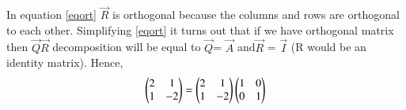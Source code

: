 \documentclass[journal,12pt,twocolumn]{IEEEtran}
\begin{document}
In equation \eqref{eqort} $\vec R$ is orthogonal because the columns and rows are orthogonal to each other.
Simplifying \eqref{eqort} it turns out that if we have orthogonal matrix then  $\vec{Q}\vec{R}$ decomposition will be equal to $\vec{Q }$= $\vec{A}$ and$\vec{ R}$ = $\vec{I}$ (R would be an identity matrix).
Hence,
\begin{align}\label{eqort1}
    \begin{pmatrix}2&1\\1&-2\end{pmatrix} = \begin{pmatrix}{2}&{1}\\{1}&{-2}\end{pmatrix}\begin{pmatrix}{1}&{0}\\{0}&{1}\end{pmatrix}
\end{align}
\end{document}
